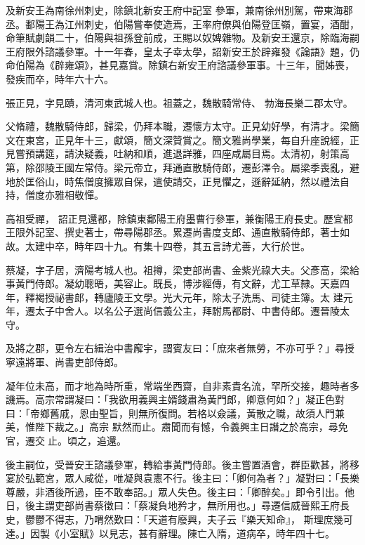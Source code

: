 \begin{pinyinscope}
 及新安王為南徐州刺史，除鎮北新安王府中記室
 參軍，兼南徐州別駕，帶東海郡丞。鄱陽王為江州刺史，伯陽嘗奉使造焉，王率府僚與伯陽登匡嶺，置宴，酒酣，命筆賦劇韻二十，伯陽與祖孫登前成，王賜以奴婢雜物。及新安王還京，除臨海嗣王府限外諮議參軍。十一年春，皇太子幸太學，詔新安王於辟雍發《論語》題，仍命伯陽為《辟雍頌》，甚見嘉賞。除鎮右新安王府諮議參軍事。十三年，聞姊喪，發疾而卒，時年六十六。



 張正見，字見賾，清河東武城人也。祖蓋之，魏散騎常侍、
 勃海長樂二郡太守。



 父脩禮，魏散騎侍郎，歸梁，仍拜本職，遷懷方太守。正見幼好學，有清才。梁簡文在東宮，正見年十三，獻頌，簡文深贊賞之。簡文雅尚學業，每自升座說經，正見嘗預講筵，請決疑義，吐納和順，進退詳雅，四座咸屬目焉。太清初，射策高第，除邵陵王國左常侍。梁元帝立，拜通直散騎侍郎，遷彭澤令。屬梁季喪亂，避地於匡俗山，時焦僧度擁眾自保，遣使請交，正見懼之，遜辭延納，然以禮法自持，僧度亦雅相敬憚。



 高祖受禪，
 詔正見還都，除鎮東鄱陽王府墨曹行參軍，兼衡陽王府長史。歷宜都王限外記室、撰史著士，帶尋陽郡丞。累遷尚書度支郎、通直散騎侍郎，著士如故。太建中卒，時年四十九。有集十四卷，其五言詩尤善，大行於世。



 蔡凝，字子居，濟陽考城人也。祖撙，梁吏部尚書、金紫光祿大夫。父彥高，梁給事黃門侍郎。凝幼聰晤，美容止。既長，博涉經傳，有文辭，尤工草隸。天嘉四年，釋褐授祕書郎，轉廬陵王文學。光大元年，除太子洗馬、司徒主簿。太
 建元年，遷太子中舍人。以名公子選尚信義公主，拜駙馬都尉、中書侍郎。遷晉陵太守。



 及將之郡，更令左右緝治中書廨宇，謂賓友曰：「庶來者無勞，不亦可乎？」尋授寧遠將軍、尚書吏部侍郎。



 凝年位未高，而才地為時所重，常端坐西齋，自非素貴名流，罕所交接，趣時者多譏焉。高宗常謂凝曰：「我欲用義興主婿錢肅為黃門郎，卿意何如？」凝正色對曰：「帝鄉舊戚，恩由聖旨，則無所復問。若格以僉議，黃散之職，故須人門兼美，惟陛下裁之。」高宗
 默然而止。肅聞而有憾，令義興主日譖之於高宗，尋免官，遷交止。頃之，追還。



 後主嗣位，受晉安王諮議參軍，轉給事黃門侍郎。後主嘗置酒會，群臣歡甚，將移宴於弘範宮，眾人咸從，唯凝與袁憲不行。後主曰：「卿何為者？」凝對曰：「長樂尊嚴，非酒後所過，臣不敢奉詔。」眾人失色。後主曰：「卿醉矣。」即令引出。他日，後主謂吏部尚書蔡徵曰：「蔡凝負地矜才，無所用也。」尋遷信威晉熙王府長史，鬱鬱不得志，乃喟然歎曰：「天道有廢興，夫子云『樂天知命』，
 斯理庶幾可達。」因製《小室賦》以見志，甚有辭理。陳亡入隋，道病卒，時年四十七。




\end{pinyinscope}
